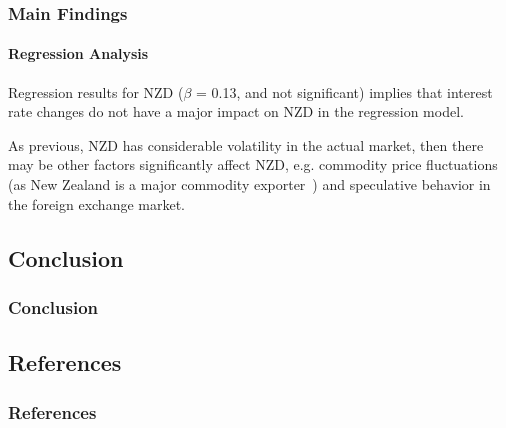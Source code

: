 \documentclass[10pt]{beamer}
\begin{document}
\begin{frame}
\frametitle{Main Findings}
\framesubtitle{Regression Analysis}
Regression results for NZD ($\beta$ = 0.13, and not significant) implies that interest rate changes do not have a major impact on NZD in the regression model. 

As previous, NZD has considerable volatility in the actual market, then there may be other factors significantly affect NZD, e.g. commodity price fluctuations (as New Zealand is a major commodity exporter~\cite{blundell1990exchange}) and speculative behavior in the foreign exchange market.
\end{frame}
\begin{frame}
\section{Conclusion}
\frametitle{Conclusion}

\end{frame}
\begin{frame}
\section{References}
\frametitle{References}
\printbibliography
\end{frame}
\end{document}

